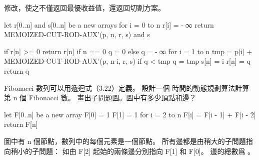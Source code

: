 \startEXERCISE
修改，使之不僅返回最優收益值，還返回切割方案。
\stopEXERCISE

\startANSWER
{}
\startCLRS
let r[0..n] and s[0..n] be a new arrays
for i = 0 to n
	r[i] = -∞
return MEMOIZED-CUT-ROD-AUX'(p, n, r, s) and s
\stopCLRS

\startCLRS
if r[n] >= 0
	return r[n]
if n == 0
	q = 0
else
	q = -∞
	for i = 1 to n
		tmp = p[i] + MEMOIZED-CUT-ROD-AUX'(p, n-i, r, s)
		if q < tmp
			q = tmp
			s[n] = i
r[n] = q
return q
\stopCLRS
\stopANSWER

\startEXERCISE
Fibonacci 數列可以用遞迴式（3.22）定義。
設計一個  時間的動態規劃算法計算第 n 個 Fibonacci 數。
畫出子問題圖。圖中有多少頂點和邊？
\stopEXERCISE

\startANSWER
{}
\startCLRS
let F[0..n] be a new array
F[0] = 1
F[1] = 1
for i = 2 to n
	F[i] = F[i - 1] + F[i - 2]
return F[n]
\stopCLRS

圖中有 n 個節點，數列中的每個元素是一個節點。
所有邊都是由稍大的子問題指向稍小的子問題：
如由 F[2] 起始的兩條邊分別指向 F[1] 和 F[0]。
邊的總數爲 。
\stopANSWER

\stopsection
